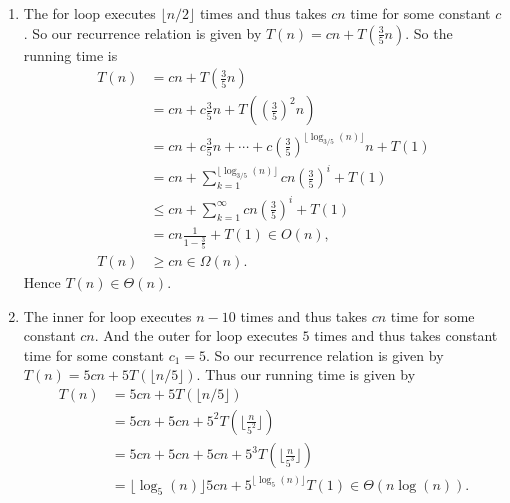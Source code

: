 \documentclass[10pt,oneside,reqno]{amsart}
\theoremstyle{plain}
\theoremstyle{definition}
\begin{document}
\begin{enumerate}[label=\arabic*.]
\item The for loop executes $\lfloor n/2 \rfloor$ times and thus takes $cn$ time for some constant $c$. So our recurrence relation is given by $T(n) = cn + T(\frac{3}{5}n)$. So the running time is
\begin{equation}
\begin{aligned}
T(n) &= cn + T(\frac{3}{5}n)\\
&= cn + c\frac{3}{5}n + T(\left(\frac{3}{5}\right)^2n)\\
&= cn + c\frac{3}{5}n + \cdots + c\left(\frac{3}{5}\right)^{\lfloor \log_{3/5}(n) \rfloor}n + T(1)\\
&= cn + \sum_{k = 1}^{\lfloor \log_{3/5}(n) \rfloor} cn\left(\frac{3}{5}\right)^{i} + T(1) \\
&\leq cn  + \sum_{k = 1}^{\infty} cn\left(\frac{3}{5}\right)^{i} + T(1)\\
&= cn \frac{1}{1 - \frac{3}{5}} + T(1) \in O(n),\\
T(n) &\geq cn \in \Omega(n).
\end{aligned}
\end{equation}
Hence $T(n) \in \Theta (n)$. \\

\item The inner for loop executes $n - 10$ times and thus takes $cn$ time for some constant $cn$. And the outer for loop executes $5$ times and thus takes constant time for some constant $c_1 = 5$. So our recurrence relation is given by $T(n) = 5cn + 5T(\lfloor n/5 \rfloor) $. Thus our running time is given by
\begin{equation}
\begin{aligned}
T(n) &= 5cn + 5T\left(\lfloor n/5 \rfloor\right)\\
&= 5cn + 5cn + 5^2T\left(\lfloor \frac{n}{5^2} \rfloor\right)\\
&= 5cn + 5cn + 5cn + 5^3T\left(\lfloor \frac{n}{5^3} \rfloor\right)\\
&= \lfloor \log_5(n) \rfloor5cn + 5^{\lfloor \log_5(n) \rfloor}T(1) \in \Theta(n\log(n)). 
\end{aligned}
\end{equation}
\vspace{3mm}


\end{enumerate}
\end{document}
